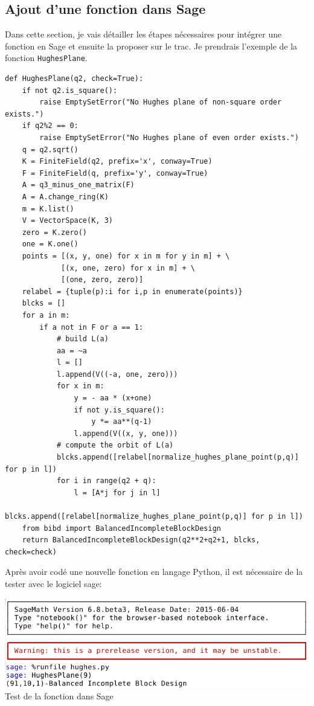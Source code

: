 \documentclass[a4paper]{article}
\begin{document}
\subsection{Ajout d'une fonction dans Sage}
Dans cette section, je vais détailler les étapes nécessaires pour intégrer une fonction en Sage et ensuite la proposer sur le trac. Je prendrais l'exemple de la fonction \texttt{HughesPlane}.\medskip\\
\begin{lstlisting}
def HughesPlane(q2, check=True):
    if not q2.is_square():
        raise EmptySetError("No Hughes plane of non-square order exists.")
    if q2%2 == 0:
        raise EmptySetError("No Hughes plane of even order exists.")
    q = q2.sqrt()
    K = FiniteField(q2, prefix='x', conway=True)
    F = FiniteField(q, prefix='y', conway=True)
    A = q3_minus_one_matrix(F)
    A = A.change_ring(K)
    m = K.list()
    V = VectorSpace(K, 3)
    zero = K.zero()
    one = K.one()
    points = [(x, y, one) for x in m for y in m] + \
             [(x, one, zero) for x in m] + \
             [(one, zero, zero)]
    relabel = {tuple(p):i for i,p in enumerate(points)}
    blcks = []
    for a in m:
        if a not in F or a == 1:
            # build L(a)
            aa = ~a
            l = []
            l.append(V((-a, one, zero)))
            for x in m:
                y = - aa * (x+one)
                if not y.is_square():
                    y *= aa**(q-1)
                l.append(V((x, y, one)))
            # compute the orbit of L(a)
            blcks.append([relabel[normalize_hughes_plane_point(p,q)] for p in l])
            for i in range(q2 + q):
                l = [A*j for j in l]
                blcks.append([relabel[normalize_hughes_plane_point(p,q)] for p in l])
    from bibd import BalancedIncompleteBlockDesign
    return BalancedIncompleteBlockDesign(q2**2+q2+1, blcks, check=check)
  \end{lstlisting}
\newpage
Après avoir codé une nouvelle fonction en langage Python, il est nécessaire de la tester avec le logiciel sage:
\begin{center}
\includegraphics[scale=0.7]{hughessage.png}\vspace{1\baselineskip}\\
Test de la fonction dans Sage
\end{center}
\end{document}
